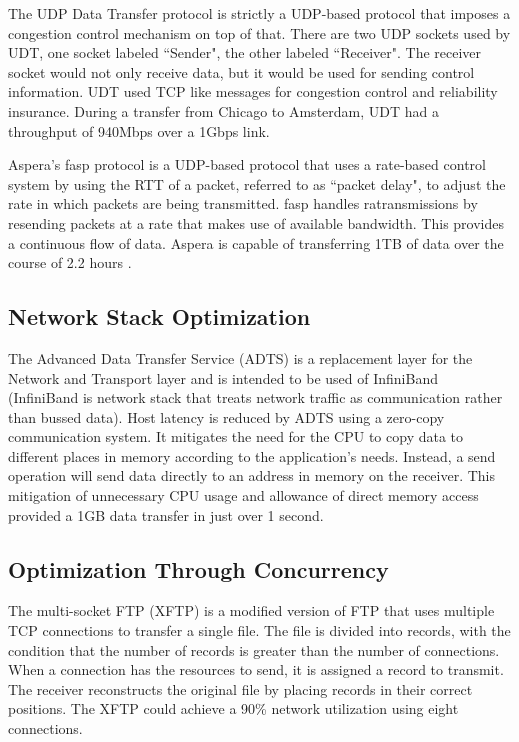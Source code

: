 The UDP Data Transfer protocol \cite{gu2007udt} is strictly a UDP-based protocol that imposes a congestion control mechanism on top of that. There are two UDP sockets used by UDT, one socket labeled ``Sender", the other labeled ``Receiver". The receiver socket would not only receive data, but it would be used for sending control information. UDT used TCP like messages for congestion control and reliability insurance. During a transfer from Chicago to Amsterdam, UDT had a throughput of 940Mbps over a 1Gbps link.

Aspera's fasp protocol \cite{Aspera2016}\cite{Fan2010} is a UDP-based protocol that uses a rate-based control system by using the RTT of a packet, referred to as ``packet delay", to adjust the rate in which packets are being transmitted. fasp handles ratransmissions by resending packets at a rate that makes use of available bandwidth. This provides a continuous flow of data. Aspera is capable of transferring 1TB of data over the course of 2.2 hours \cite{Fan2010}.

\subsection{Network Stack Optimization}

The Advanced Data Transfer Service (ADTS) \cite{lai2009designing} is a replacement layer for the Network and Transport layer and is intended to be used of InfiniBand \cite{Pfister2001} (InfiniBand is network stack that treats network traffic as communication rather than bussed data). Host latency is reduced by ADTS using a zero-copy communication system. It mitigates the need for the CPU to copy data to different places in memory according to the application's needs. Instead, a send operation will send data directly to an address in memory on the receiver. This mitigation of unnecessary CPU usage and allowance of direct memory access provided a 1GB data transfer in just over 1 second.

\subsection{Optimization Through Concurrency}

The multi-socket FTP (XFTP) \cite{Allman1995}\cite{Allman1997} is a modified version of FTP \cite{postel1980user} that uses multiple TCP connections to transfer a single file. The file is divided into records, with the condition that the number of records is greater than the number of connections. When a connection has the resources to send, it is assigned a record to transmit. The receiver reconstructs the original file by placing records in their correct positions. The XFTP could achieve a 90\% network utilization using eight connections.

